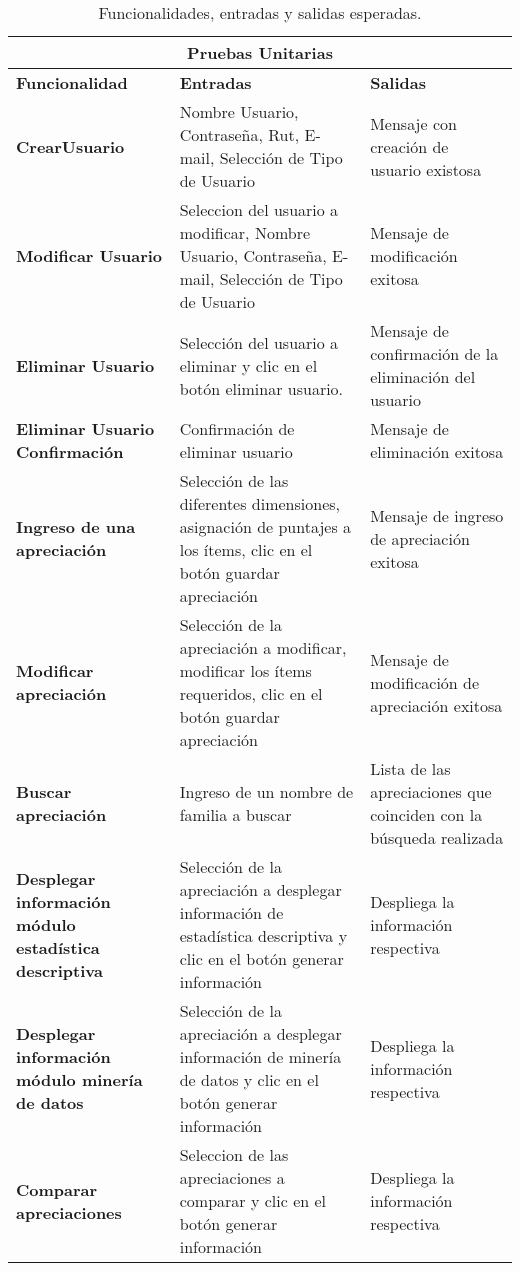 \begin{table}[h!]
	\begin{tabular}{|p{6cm}|p{6cm}|p{5cm}|}
		\hline
		\multicolumn{3}{|c|}{\textbf{Pruebas Unitarias}}                                                                                                                                                                                                           \\ \hline
		\textbf{Funcionalidad}&\textbf{Entradas} & \textbf{Salidas} \\
		\hline\textbf{CrearUsuario} & \multicolumn{1}{p{6cm}|}{Nombre Usuario, Contraseña, Rut, E-mail, Selección de Tipo de Usuario} & Mensaje con creación de usuario existosa \\ \hline \multicolumn{1}{|p{6cm}|}{\textbf{Modificar Usuario}} & Seleccion del usuario a modificar, Nombre Usuario, Contraseña, E-mail, Selección de Tipo de Usuario & Mensaje de modificación exitosa \\ \hline \textbf{Eliminar Usuario} & Selección del usuario a eliminar y clic en el botón eliminar usuario. & Mensaje de confirmación de la eliminación del usuario\\ \hline	\textbf{Eliminar Usuario Confirmación} & Confirmación de eliminar usuario & Mensaje de eliminación exitosa  \\ \hline \textbf{Ingreso de una apreciación} & Selección de las diferentes dimensiones, asignación de puntajes a los ítems, clic en el botón guardar apreciación & Mensaje de ingreso de apreciación exitosa \\ \hline \textbf{Modificar apreciación} & Selección de la apreciación a modificar, modificar los ítems requeridos, clic en el botón guardar apreciación & Mensaje de modificación de apreciación exitosa \\ \hline
		\textbf{Buscar apreciación} & Ingreso de un nombre de familia a buscar & Lista de las apreciaciones que coinciden con la búsqueda realizada \\ \hline	\textbf{Desplegar información módulo estadística descriptiva} & Selección de la apreciación a desplegar información de estadística descriptiva y clic en el botón generar información & Despliega la información respectiva\\ \hline
		\textbf{Desplegar información módulo minería de datos} & Selección de la apreciación a desplegar información de minería de datos  y clic en el botón generar información & Despliega la información respectiva\\ \hline
		\textbf{Comparar apreciaciones} & Seleccion de las apreciaciones a comparar y clic en el botón generar información & Despliega la información respectiva\\ \hline
	\end{tabular}
	\caption{Funcionalidades, entradas y salidas esperadas.}
\end{table}

